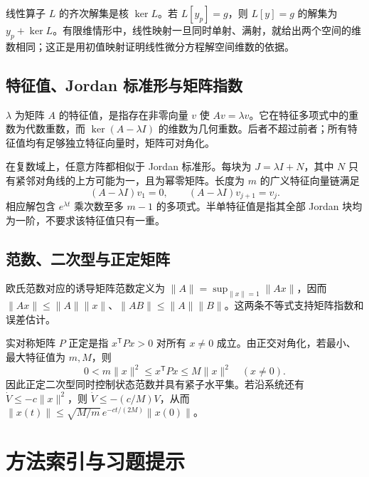 \documentclass[UTF8,12pt,a4paper,fontset=fandol]{ctexbook}
\begin{document}
线性算子 $L$ 的齐次解集是核 $\ker L$。若 $L[y_p]=g$，则 $L[y]=g$ 的解集为 $y_p+\ker L$。有限维情形中，线性映射一旦同时单射、满射，就给出两个空间的维数相同；这正是用初值映射证明线性微分方程解空间维数的依据。

\section{特征值、Jordan 标准形与矩阵指数}
$\lambda$ 为矩阵 $A$ 的特征值，是指存在非零向量 $v$ 使 $Av=\lambda v$。它在特征多项式中的重数为代数重数，而 $\ker(A-\lambda I)$ 的维数为几何重数。后者不超过前者；所有特征值均有足够独立特征向量时，矩阵可对角化。

在复数域上，任意方阵都相似于 Jordan 标准形。每块为 $J=\lambda I+N$，其中 $N$ 只有紧邻对角线的上方可能为一，且为幂零矩阵。长度为 $m$ 的广义特征向量链满足
\[
 (A-\lambda I)v_1=0,\qquad (A-\lambda I)v_{j+1}=v_j.
\]
相应解包含 $e^{\lambda t}$ 乘次数至多 $m-1$ 的多项式。半单特征值是指其全部 Jordan 块均为一阶，不要求该特征值只有一重。

\section{范数、二次型与正定矩阵}
欧氏范数对应的诱导矩阵范数定义为 $\|A\|=\sup_{\|x\|=1}\|Ax\|$，因而 $\|Ax\|\leq\|A\|\|x\|$、$\|AB\|\leq\|A\|\|B\|$。这两条不等式支持矩阵指数和误差估计。

实对称矩阵 $P$ 正定是指 $x^{\mathsf T}Px>0$ 对所有 $x\ne0$ 成立。由正交对角化，若最小、最大特征值为 $m,M$，则
\[
 0<m\|x\|^2\leq x^{\mathsf T}Px\leq M\|x\|^2\quad(x\ne0).
\]
因此正定二次型同时控制状态范数并具有紧子水平集。若沿系统还有 $\dot V\leq-c\|x\|^2$，则 $\dot V\leq-(c/M)V$，从而 $\|x(t)\|\leq\sqrt{M/m}\,e^{-ct/(2M)}\|x(0)\|$。

\chapter{方法索引与习题提示}
\label{app:ode-methods}
\end{document}
